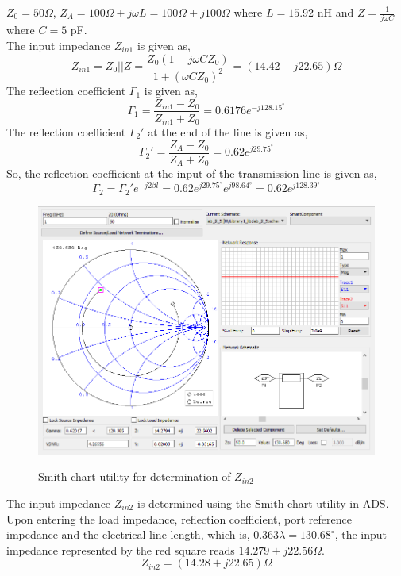 \documentclass{lab_sheet}
\newcommand\ddfrac[2]{{\displaystyle\frac{\displaystyle #1}{\displaystyle #2}}}
\begin{document}
$Z_0=50\Omega$, $Z_A = 100 \Omega+ j\omega L = 100 \Omega + j100 \Omega$ where $L = 15.92$ nH and $Z=\ddfrac{1}{j\omega C}$ where $C = 5$ pF.\\
The input impedance $Z_{in1}$ is given as,
\begin{equation*}
    Z_{in1}=Z_0||Z=\frac{Z_0(1-j\omega C Z_0)}{1+(\omega CZ_0)^2}=(14.42-j22.65)\Omega
\end{equation*}
The reflection coefficient $\Gamma_1$ is given as,
\begin{equation*}
    \Gamma_1=\frac{Z_{in1}-Z_0}{Z_{in1}+Z_0}=0.6176e^{-j128.15^\circ}
\end{equation*}
The reflection coefficient $\Gamma_2'$ at the end of the line is given as,
\begin{equation*}
    \Gamma_2'=\frac{Z_{A}-Z_0}{Z_{A}+Z_0}=0.62e^{j29.75^\circ}
\end{equation*}
So, the reflection coefficient at the input of the transmission line is given as,
\begin{equation*}
    \Gamma_2=\Gamma_2'e^{-j2\beta l}=0.62e^{j29.75^\circ}e^{j98.64^\circ}=0.62e^{j128.39^\circ}
\end{equation*}
\begin{figure}[H]
    \centering
    \includegraphics[width=0.8\linewidth,frame]{../Figures/scu.png}
\label{fig:scu}
\caption{Smith chart utility for determination of $Z_{in2}$}
\end{figure}
The input impedance $Z_{in2}$ is determined using the Smith chart utility in ADS. Upon entering the load impedance, reflection coefficient, port reference impedance and the electrical line length, which is, $0.363\lambda=130.68^\circ$, the input impedance represented by the red square reads $14.279+j22.56\Omega$.
\begin{equation*}
    Z_{in2}=(14.28+j22.65)\Omega
\end{equation*}
\end{document}
